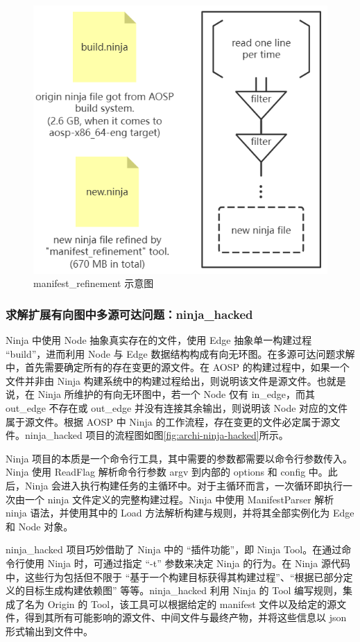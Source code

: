\begin{figure}
    \centering
    \includegraphics[width=.5\textwidth]{figures/archi-manifest-refinement.png}
    \caption{manifest\_refinement 示意图}
    \label{fig:archi-manifest-refinement}
\end{figure}

\subsubsection{求解扩展有向图中多源可达问题：ninja\_hacked}

Ninja 中使用 Node 抽象真实存在的文件，使用 Edge 抽象单一构建过程 “build”，进而利用 Node 与 Edge 数据结构构成有向无环图。在多源可达问题求解中，首先需要确定所有的存在变更的源文件。在 AOSP 的构建过程中，如果一个文件并非由 Ninja 构建系统中的构建过程给出，则说明该文件是源文件。也就是说，在 Ninja 所维护的有向无环图中，若一个 Node 仅有 in\_edge，而其 out\_edge 不存在或 out\_edge 并没有连接其余输出，则说明该 Node 对应的文件属于源文件。根据 AOSP 中 Ninja 的工作流程，存在变更的文件必定属于源文件。ninja\_hacked 项目的流程图如图\ref{fig:archi-ninja-hacked}所示。

Ninja 项目的本质是一个命令行工具，其中需要的参数都需要以命令行参数传入。Ninja 使用 ReadFlag 解析命令行参数 argv 到内部的 options 和 config 中。此后，Ninja 会进入执行构建任务的主循环中。对于主循环而言，一次循环即执行一次由一个 ninja 文件定义的完整构建过程。Ninja 中使用 ManifestParser 解析 ninja 语法，并使用其中的 Load 方法解析构建与规则，并将其全部实例化为 Edge 和 Node 对象。

ninja\_hacked 项目巧妙借助了 Ninja 中的 “插件功能”，即 Ninja Tool。在通过命令行使用 Ninja 时，可通过指定 “-t” 参数来决定 Ninja 的行为。在 Ninja 源代码中，这些行为包括但不限于 “基于一个构建目标获得其构建过程”、“根据已部分定义的目标生成构建依赖图” 等等。ninja\_hacked 利用 Ninja 的 Tool 编写规则，集成了名为 Origin 的 Tool，该工具可以根据给定的 manifest 文件以及给定的源文件，得到其所有可能影响的源文件、中间文件与最终产物，并将这些信息以 json 形式输出到文件中。

